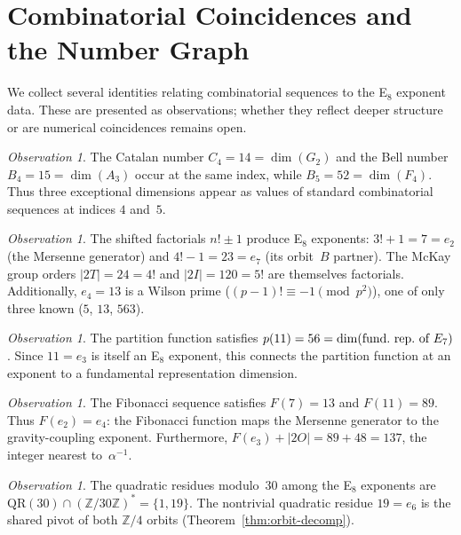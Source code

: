 \documentclass[11pt]{amsart}
\theoremstyle{plain}
\theoremstyle{definition}
\theoremstyle{remark}
\newtheorem{observation}[theorem]{Observation}
\begin{document}
\section{Combinatorial Coincidences and the Number Graph}
\label{sec:combinatorial}

We collect several identities relating combinatorial sequences to the
E$_8$ exponent data.  These are presented as observations; whether they
reflect deeper structure or are numerical coincidences remains open.

\begin{observation}\label{obs:catalan-bell}
The Catalan number $C_4 = 14 = \dim(G_2)$ and the Bell number
$B_4 = 15 = \dim(A_3)$ occur at the same index, while
$B_5 = 52 = \dim(F_4)$.  Thus three exceptional dimensions appear as
values of standard combinatorial sequences at indices $4$ and~$5$.
\end{observation}

\begin{observation}\label{obs:factorial-exponents}
The shifted factorials $n! \pm 1$ produce E$_8$ exponents:
$3! + 1 = 7 = e_2$ (the Mersenne generator) and
$4! - 1 = 23 = e_7$ (its orbit~$B$ partner).
The McKay group orders $|2T| = 24 = 4!$ and $|2I| = 120 = 5!$
are themselves factorials.  Additionally, $e_4 = 13$ is a Wilson
prime ($(p-1)! \equiv -1 \pmod{p^2}$), one of only three known
($5$, $13$, $563$).
\end{observation}

\begin{observation}\label{obs:partition}
The partition function satisfies $p(11) = 56 = \dim(\text{fund.\ rep.\
of } E_7)$.  Since $11 = e_3$ is itself an E$_8$ exponent, this
connects the partition function at an exponent to a fundamental
representation dimension.
\end{observation}

\begin{observation}\label{obs:fibonacci}
The Fibonacci sequence satisfies $F(7) = 13$ and $F(11) = 89$.  Thus
$F(e_2) = e_4$: the Fibonacci function maps the Mersenne generator to
the gravity-coupling exponent.  Furthermore,
$F(e_3) + |2O| = 89 + 48 = 137$, the integer nearest to~$\alpha^{-1}$.
\end{observation}

\begin{observation}\label{obs:QR}
The quadratic residues modulo~$30$ among the E$_8$ exponents are
$\mathrm{QR}(30) \cap (\mathbb{Z}/30\mathbb{Z})^* = \{1, 19\}$.
The nontrivial quadratic residue $19 = e_6$ is the shared pivot of
both $\mathbb{Z}/4$ orbits (Theorem~\ref{thm:orbit-decomp}).
\end{observation}
\end{document}
